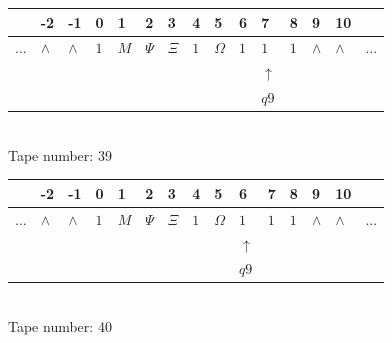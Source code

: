 \documentclass[11pt]{article}
\begin{document}
\begin{table}[H]
\centering
\begin{tabular}{lllllllllllllll}
 & -2 & -1 & 0 & 1 & 2 & 3 & 4 & 5 & 6 & 7 & 8 & 9 & 10 & \\
\hline
$...$ & \multicolumn{1}{|l|}{$\wedge$} & \multicolumn{1}{|l|}{$\wedge$} & \multicolumn{1}{|l|}{$1$} & \multicolumn{1}{|l|}{$M$} & \multicolumn{1}{|l|}{$\Psi$} & \multicolumn{1}{|l|}{$\Xi$} & \multicolumn{1}{|l|}{$1$} & \multicolumn{1}{|l|}{$\Omega$} & \multicolumn{1}{|l|}{$1$} & \multicolumn{1}{|l|}{$1$} & \multicolumn{1}{|l|}{$1$} & \multicolumn{1}{|l|}{$\wedge$} & \multicolumn{1}{|l|}{$\wedge$} & $...$\\
\hline
&  &  &  &  &  &  &  &  &  & $\uparrow$ &  &  &  &  \\
&  &  &  &  &  &  &  &  &  & $ q9 $ &  &  &  &  \\
\end{tabular}
\\
Tape number: 39
\noindent\makebox[\linewidth]{\hdashrule{\textwidth}{1pt}{1pt}}\end{table}

\begin{table}[H]
\centering
\begin{tabular}{lllllllllllllll}
 & -2 & -1 & 0 & 1 & 2 & 3 & 4 & 5 & 6 & 7 & 8 & 9 & 10 & \\
\hline
$...$ & \multicolumn{1}{|l|}{$\wedge$} & \multicolumn{1}{|l|}{$\wedge$} & \multicolumn{1}{|l|}{$1$} & \multicolumn{1}{|l|}{$M$} & \multicolumn{1}{|l|}{$\Psi$} & \multicolumn{1}{|l|}{$\Xi$} & \multicolumn{1}{|l|}{$1$} & \multicolumn{1}{|l|}{$\Omega$} & \multicolumn{1}{|l|}{$1$} & \multicolumn{1}{|l|}{$1$} & \multicolumn{1}{|l|}{$1$} & \multicolumn{1}{|l|}{$\wedge$} & \multicolumn{1}{|l|}{$\wedge$} & $...$\\
\hline
&  &  &  &  &  &  &  &  & $\uparrow$ &  &  &  &  &  \\
&  &  &  &  &  &  &  &  & $ q9 $ &  &  &  &  &  \\
\end{tabular}
\\
Tape number: 40
\noindent\makebox[\linewidth]{\hdashrule{\textwidth}{1pt}{1pt}}\end{table}
\end{document}
